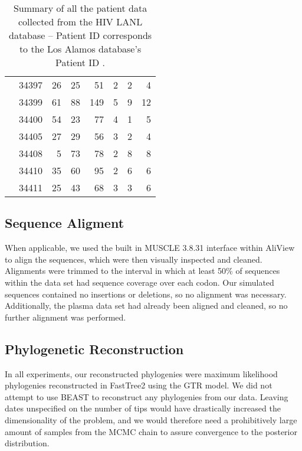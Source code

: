 \begin{table*}[!ht]
\begin{center}
\begin{tabular}{llrrrrrr}
& 34397 &      26 &       25 &       51 &        2 &        2 &        4  \\ 
& 34399 &      61 &       88 &      149 &        5 &        9 &       12  \\ 
& 34400 &      54 &       23 &       77 &        4 &        1 &        5  \\ 
& 34405 &      27 &       29 &       56 &        3 &        2 &        4  \\ 
& 34408 &       5 &       73 &       78 &        2 &        8 &        8 \\ 
& 34410 &      35 &       60 &       95 &        2 &        6 &        6 \\ 
& 34411 &      25 &       43 &       68 &        3 &        3 &        6   \\ \hline
\end{tabular}
\end{center}
  \caption{Summary of all the patient data collected from the HIV LANL database -- Patient ID corresponds to the Los Alamos database's Patient ID \citep{LosAlamos}.
   }\label{tab:patients} 
\end{table*}

\subsection{Sequence Aligment} \label{subsec:seqalign}
When applicable, we used the built in MUSCLE 3.8.31 \citep{Muscle04} interface within AliView \citep{AliView14} to align the sequences, which were then visually inspected and cleaned. 
Alignments were trimmed to the interval in which at least  50\% of sequences within the data set had sequence coverage over each codon.
Our simulated sequences contained no insertions or deletions, so no alignment was necessary. 
Additionally, the plasma data set \citep{McCloskey14} had already been aligned and cleaned, so no further alignment was performed.


\subsection{Phylogenetic Reconstruction} \label{subsec:phylo}
In all experiments, our reconstructed phylogenies were maximum likelihood phylogenies reconstructed in FastTree2 \citep{FastTree10} using the GTR model.
We did not attempt to use BEAST \citep{BEAST} to reconstruct any phylogenies from our data.
Leaving dates unspecified on the number of tips would have drastically increased the dimensionality of the problem, and we would therefore need a prohibitively large amount of samples from the MCMC chain to assure convergence to the posterior distribution.


